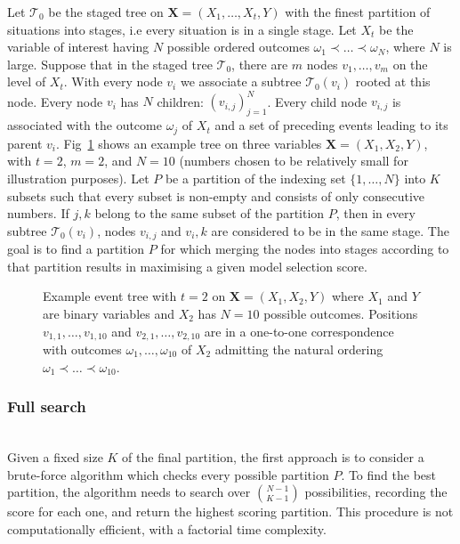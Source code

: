 \documentclass[runningheads]{llncs}
\begin{document}
Let $\mathcal{T}_0$ be the staged tree on $\boldsymbol{X} = (X_1, \ldots, X_t, Y)$ with the finest partition of situations into stages, i.e every situation is in a single stage. Let $X_t$ be the variable of interest having $N$ possible ordered outcomes $\omega_1\prec\ldots\prec\omega_N$, where $N$ is large. Suppose that in the staged tree $\mathcal{T}_0$, there are $m$ nodes $v_1, \ldots, v_m$ on the level of $X_t$. With every node $v_i$ we associate a subtree $\mathcal{T}_0(v_i)$ rooted at this node. Every node $v_i$ has $N$ children: $(v_{i,j})_{j = 1}^{N}$. Every child node $v_{i,j}$ is associated with the outcome $\omega_j$ of $X_t$ and a set of preceding events leading to its parent $v_i$. Fig~\ref{fig:example-tree} shows an example tree on three variables $\boldsymbol{X} = (X_1, X_2, Y)$, with $t = 2$, $m = 2$, and $N = 10$ (numbers chosen to be relatively small for illustration purposes). Let $P$ be a partition of the indexing set $\{1, \ldots, N\}$ into $K$ subsets such that every subset is non-empty and consists of only consecutive numbers. If $j, k$ belong to the same subset of the partition $P$, then in every subtree $\mathcal{T}_0(v_i)$, nodes $v_{i,j}$ and $v_i, k$ are considered to be in the same stage.
The goal is to find a partition $P$ for which merging the nodes into stages according to that partition results in maximising a given model selection score.
\begin{figure}
\centering

\vspace{1ex}
\caption{Example event tree with $t = 2$ on $\boldsymbol{X} = (X_1, X_2, Y)$ where $X_1$ and $Y$ are binary variables and $X_2$ has $N = 10$ possible outcomes. Positions $v_{1,1}, \ldots, v_{1,10}$ and $v_{2,1}, \ldots, v_{2,10}$ are in a one-to-one correspondence with outcomes $\omega_1, \ldots, \omega_{10}$ of $X_2$ admitting the natural ordering $\omega_1 \prec \ldots \prec \omega_{10}$.}
\label{fig:example-tree}
\end{figure}

\subsubsection{Full search}
\hfill\\
Given a fixed size $K$ of the final partition, the first approach is to consider a brute-force algorithm which checks every possible partition $P$. To find the best partition, the algorithm needs to search over $\binom{N-1}{K-1}$ possibilities, recording the score for each one, and return the highest scoring partition. This procedure is not computationally efficient, with a factorial time complexity.
\end{document}
